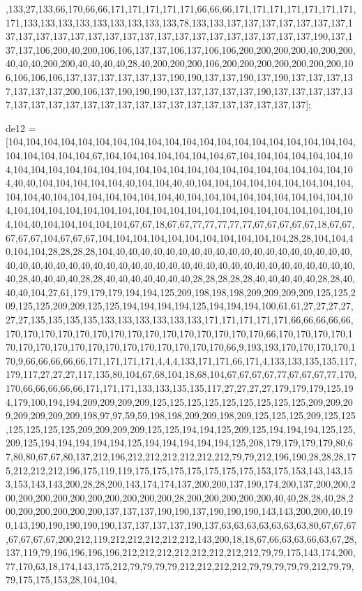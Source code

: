 ,133,27,133,66,170,66,66,171,171,171,171,171,66,66,66,171,171,171,171,171,171,171,171,133,133,133,133,133,133,133,133,133,78,133,133,137,137,137,137,137,137,137,137,137,137,137,137,137,137,137,137,137,137,137,137,137,137,137,137,137,190,137,137,137,106,200,40,200,106,106,137,137,106,137,106,106,200,200,200,200,40,200,200,40,40,40,200,200,40,40,40,40,28,40,200,200,200,106,200,200,200,200,200,200,200,106,106,106,106,137,137,137,137,137,137,190,190,137,137,190,137,190,137,137,137,137,137,137,137,200,106,137,190,190,190,137,137,137,137,137,190,137,137,137,137,137,137,137,137,137,137,137,137,137,137,137,137,137,137,137,137,137,137];

de12 = [104,104,104,104,104,104,104,104,104,104,104,104,104,104,104,104,104,104,104,104,104,104,104,104,104,67,104,104,104,104,104,104,104,67,104,104,104,104,104,104,104,104,104,104,104,104,104,104,104,104,104,104,104,104,104,104,104,104,104,104,104,40,40,104,104,104,104,104,40,104,104,40,40,104,104,104,104,104,104,104,104,104,104,104,40,104,104,104,104,104,104,104,40,104,104,104,104,104,104,104,104,104,104,104,104,104,104,104,104,104,104,104,104,104,104,104,104,104,104,104,104,104,104,104,40,104,104,104,104,104,67,67,18,67,67,77,77,77,77,77,67,67,67,67,67,18,67,67,67,67,67,104,67,67,67,104,104,104,104,104,104,104,104,104,104,104,28,28,104,104,40,104,104,28,28,28,28,104,40,40,40,40,40,40,40,40,40,40,40,40,40,40,40,40,40,40,40,40,40,40,40,40,40,40,40,40,40,40,40,40,40,40,40,40,40,40,40,40,40,40,40,40,40,40,40,40,28,40,40,40,40,28,28,40,40,40,40,40,40,40,28,28,28,28,28,40,40,40,40,40,28,28,40,40,40,104,27,61,179,179,179,194,194,125,209,198,198,198,209,209,209,209,125,125,209,125,125,209,209,125,125,194,194,194,194,125,194,194,194,100,61,61,27,27,27,27,27,27,135,135,135,135,133,133,133,133,133,133,171,171,171,171,171,66,66,66,66,66,170,170,170,170,170,170,170,170,170,170,170,170,170,170,170,66,170,170,170,170,170,170,170,170,170,170,170,170,170,170,170,170,170,66,9,193,193,170,170,170,170,170,9,66,66,66,66,66,171,171,171,171,4,4,4,133,171,171,66,171,4,133,133,135,135,117,179,117,27,27,27,117,135,80,104,67,68,104,18,68,104,67,67,67,67,77,67,67,67,77,170,170,66,66,66,66,66,171,171,171,133,133,135,135,117,27,27,27,27,179,179,179,125,194,179,100,194,194,209,209,209,209,125,125,125,125,125,125,125,125,125,209,209,209,209,209,209,209,198,97,97,59,59,198,198,209,209,198,209,125,125,125,209,125,125,125,125,125,125,209,209,209,209,125,125,194,194,125,209,125,194,194,194,125,125,209,125,194,194,194,194,194,125,194,194,194,194,194,125,208,179,179,179,179,80,67,80,80,67,67,80,137,212,196,212,212,212,212,212,212,79,79,212,196,190,28,28,28,175,212,212,212,196,175,119,119,175,175,175,175,175,175,175,153,175,153,143,143,153,153,143,143,200,28,28,200,143,174,174,137,200,200,137,190,174,200,137,200,200,200,200,200,200,200,200,200,200,200,200,28,200,200,200,200,200,40,40,28,28,40,28,200,200,200,200,200,200,137,137,137,190,190,137,190,190,190,143,143,200,200,40,190,143,190,190,190,190,190,137,137,137,137,190,137,63,63,63,63,63,63,63,80,67,67,67,67,67,67,67,200,212,119,212,212,212,212,212,143,200,18,18,67,66,63,63,66,63,67,28,137,119,79,196,196,196,196,212,212,212,212,212,212,212,212,79,79,175,143,174,200,77,170,63,18,174,143,175,212,79,79,79,79,212,212,212,212,79,79,79,79,79,212,79,79,79,175,175,153,28,104,104,